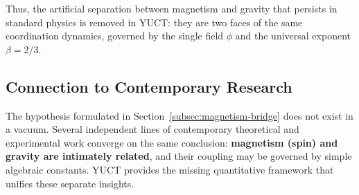 \documentclass[12pt]{article}
\theoremstyle{remark}
\begin{document}
	Thus, the artificial separation between magnetism and gravity that persists in
	standard physics is removed in YUCT: they are two faces of the same coordination
	dynamics, governed by the single field $\phi$ and the universal exponent $\beta = 2/3$.
	
	\subsection{Connection to Contemporary Research}
	\label{subsec:mainstream}
	
	The hypothesis formulated in Section~\ref{subsec:magnetism-bridge} does not exist in a vacuum.
	Several independent lines of contemporary theoretical and experimental work
	converge on the same conclusion: \textbf{magnetism (spin) and gravity are
		intimately related}, and their coupling may be governed by simple
	algebraic constants.  YUCT provides the missing quantitative framework
	that unifies these separate insights.
	
\end{document}
